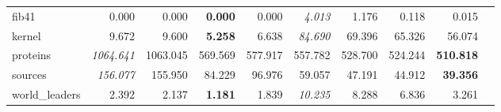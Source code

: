 \documentclass[10pt,a4paper]{standalone}
\begin{document}
\begin{tabular}{|l||r|r|r|r|r|r|r|r|r|}
          fib41 &           0.000 &          0.000 &  \textbf{0.000} &   0.000 &   \emph{4.013} &   1.176 &   0.118 &            0.015 \\
         kernel &           9.672 &          9.600 &  \textbf{5.258} &   6.638 &  \emph{84.690} &  69.396 &  65.326 &           56.074 \\
       proteins & \emph{1064.641} &       1063.045 &         569.569 & 577.917 &        557.782 & 528.700 & 524.244 & \textbf{510.818} \\
        sources &  \emph{156.077} &        155.950 &          84.229 &  96.976 &         59.057 &  47.191 &  44.912 &  \textbf{39.356} \\
 world\_leaders &           2.392 &          2.137 &  \textbf{1.181} &   1.839 &  \emph{10.235} &   8.288 &   6.836 &            3.261 \\
 	\hline
\end{tabular}
\end{document}
